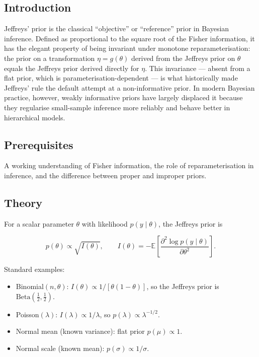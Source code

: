\documentclass[
]{article}
\author{}
\date{\vspace{-2.5em}}
\providecommand{\tightlist}{%
  \setlength{\itemsep}{0pt}\setlength{\parskip}{0pt}}
\begin{document}
\subsection{Introduction}\label{introduction}

Jeffreys' prior is the classical ``objective'' or ``reference'' prior in
Bayesian inference. Defined as proportional to the square root of the
Fisher information, it has the elegant property of being invariant under
monotone reparameterisation: the prior on a transformation
\(\eta = g(\theta)\) derived from the Jeffreys prior on \(\theta\)
equals the Jeffreys prior derived directly for \(\eta\). This invariance
--- absent from a flat prior, which is parameterisation-dependent --- is
what historically made Jeffreys' rule the default attempt at a
non-informative prior. In modern Bayesian practice, however, weakly
informative priors have largely displaced it because they regularise
small-sample inference more reliably and behave better in hierarchical
models.

\subsection{Prerequisites}\label{prerequisites}

A working understanding of Fisher information, the role of
reparameterisation in inference, and the difference between proper and
improper priors.

\subsection{Theory}\label{theory}

For a scalar parameter \(\theta\) with likelihood \(p(y \mid \theta)\),
the Jeffreys prior is

\[p(\theta) \propto \sqrt{I(\theta)}, \qquad I(\theta) = -\mathbb E\!\left[\frac{\partial^2 \log p(y \mid \theta)}{\partial \theta^2}\right].\]

Standard examples:

\begin{itemize}
\tightlist
\item
  Binomial\((n, \theta)\): \(I(\theta) \propto 1 / [\theta(1-\theta)]\),
  so the Jeffreys prior is
  \(\mathrm{Beta}(\tfrac{1}{2}, \tfrac{1}{2})\).
\item
  Poisson\((\lambda)\): \(I(\lambda) \propto 1 / \lambda\), so
  \(p(\lambda) \propto \lambda^{-1/2}\).
\item
  Normal mean (known variance): flat prior \(p(\mu) \propto 1\).
\item
  Normal scale (known mean): \(p(\sigma) \propto 1 / \sigma\).
\end{itemize}
\end{document}
